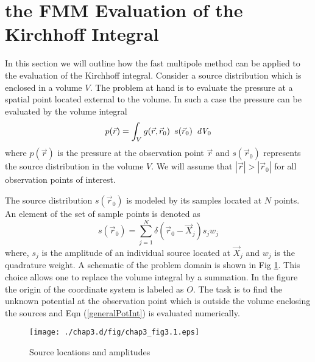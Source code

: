 
\section{the FMM Evaluation of the Kirchhoff Integral}\label{chap3-KIF}

In this  section we will outline  how the fast multipole method can be 
applied to the evaluation of the Kirchhoff integral. 
Consider a source distribution which is enclosed in a volume $V$.
The problem at hand is to evaluate the pressure at a spatial point located
external to the volume.
In such a case the pressure can be evaluated by the volume integral
\begin{equation}\label{generalPotInt}
p(\vec{r}) = \int_{V} g(\vec{r},\vec{r}_0)\enskip{s(\vec{r}_0)} \enskip  \textit{dV}_0
\end{equation}   
where  $p(\vec {r})$ is the pressure  at the observation  point $\vec{r}$ 
and   $s(\vec{r}_0)$ represents the source distribution 
in the volume $V$. We will assume that $|\vec{r}|>|\vec{r}_0|$ for all observation points of
interest.

The  source distribution $s(\vec{r}_0)$ is modeled  by its samples located at $N$ points. An element of the set of sample points is 
denoted as
\begin{equation}
\label{chap2/1}
s(\vec{r}_0) = \sum_{j=1}^{N}{\delta(\vec{r}_0-\vec{X}_j)s_j w_j}  
\end{equation}
where, $s_j$ is the amplitude of an individual source located at $\vec{X}_j$
and $w_j$ is the quadrature weight. A schematic of the problem domain is
shown in Fig \ref{source location}. This choice allows one to
replace the volume integral by a summation.
In the figure the origin of the coordinate system is labeled as $O$. 
The task is to find the unknown potential at the observation point which is outside the volume enclosing the sources and  
Eqn (\ref{generalPotInt}) is evaluated numerically.
\begin{figure}
\begin{center}
\texttt{[image: ./chap3.d/fig/chap3\_fig3.1.eps]}
\caption{Source locations and amplitudes }
\label{source location}
\end{center}
\end{figure}

